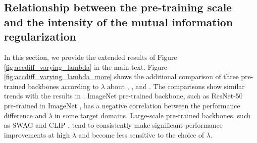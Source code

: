 \subsection{Relationship between the pre-training scale and the intensity of the mutual information regularization}
\label{subsec:accdiff_by_lambda_more}

In this section, we provide the extended results of Figure \ref{fig:accdiff_varying_lambda} in the main text. Figure \ref{fig:accdiff_varying_lambda_more} shows the additional comparison of three pre-trained backbones according to $\lambda$ about \oh{}, \tr{}, and \dn{}. The comparisons show similar trends with the results in \pacs{}. ImageNet pre-trained backbone, such as ResNet-50 pre-trained in ImageNet \cite{he2016_cvpr_resnet}, has a negative correlation between the performance difference and $\lambda$ in some target domains. Large-scale pre-trained backbones, such as SWAG \cite{singh2022swag} and CLIP \cite{radford2021clip}, tend to consistently make significant performance improvements at high $\lambda$ and become less sensitive to the choice of $\lambda$. 



